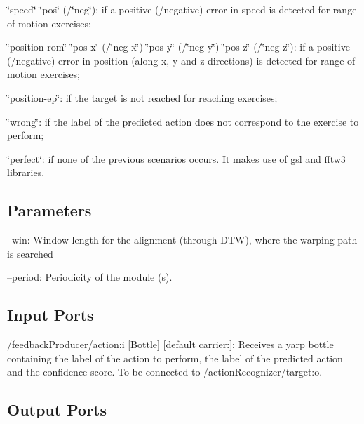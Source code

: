 \begin{DoxyItemize}
\item \char`\"{}speed\char`\"{} \char`\"{}pos\char`\"{} (/\char`\"{}neg\char`\"{})\+: if a positive (/negative) error in speed is detected for range of motion exercises;
\item \char`\"{}position-\/rom\char`\"{} \char`\"{}pos x\char`\"{} (/\char`\"{}neg x\char`\"{}) \char`\"{}pos y\char`\"{} (/\char`\"{}neg y\char`\"{}) \char`\"{}pos z\char`\"{} (/\char`\"{}neg z\char`\"{})\+: if a positive (/negative) error in position (along x, y and z directions) is detected for range of motion exercises;
\item \char`\"{}position-\/ep\char`\"{}\+: if the target is not reached for reaching exercises;
\item \char`\"{}wrong\char`\"{}\+: if the label of the predicted action does not correspond to the exercise to perform;
\item \char`\"{}perfect\char`\"{}\+: if none of the previous scenarios occurs. It makes use of gsl and fftw3 libraries.
\end{DoxyItemize}\hypertarget{group__skeletonViewer_parameters_sec}{}\subsection{Parameters}\label{group__skeletonViewer_parameters_sec}

\begin{DoxyItemize}
\item --win\+: Window length for the alignment (through D\+TW), where the warping path is searched
\item --period\+: Periodicity of the module (s). 
\end{DoxyItemize}\hypertarget{group__skeletonViewer_inputports_sec}{}\subsection{Input Ports}\label{group__skeletonViewer_inputports_sec}

\begin{DoxyItemize}
\item /feedback\+Producer/action\+:i \mbox{[}Bottle\mbox{]} \mbox{[}default carrier\+:\mbox{]}\+: Receives a yarp bottle containing the label of the action to perform, the label of the predicted action and the confidence score. To be connected to /action\+Recognizer/target\+:o.
\end{DoxyItemize}\hypertarget{group__skeletonViewer_outputports_sec}{}\subsection{Output Ports}\label{group__skeletonViewer_outputports_sec}

